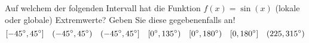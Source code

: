 \item Auf welchem der folgenden Intervall hat die Funktion $f(x)=\sin(x)$ (lokale oder globale) Extremwerte? Geben Sie diese gegebenenfalls an! 
$$
	[-\SI{45}{\degree},\SI{45}{\degree}] \hskip 10pt (-\SI{45}{\degree},\SI{45}{\degree}) \hskip 10pt (-\SI{45}{\degree},\SI{45}{\degree}] \hskip 10pt [\SI{0}{\degree},\SI{135}{\degree})  \hskip 10pt [\SI{0}{\degree},\SI{180}{\degree}) \hskip 10pt [0,\SI{180}{\degree}] \hskip 10pt (225,\SI{315}{\degree}) 
$$
